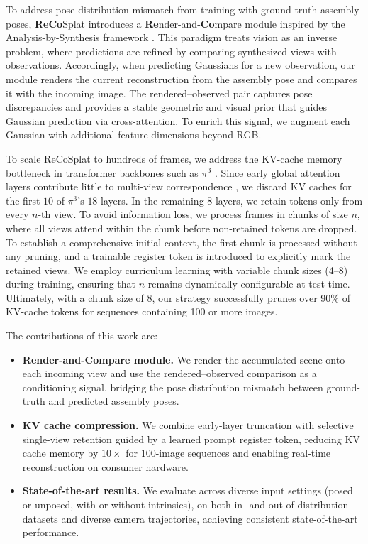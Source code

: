 \documentclass[runningheads]{llncs}
\begin{document}
To address pose distribution mismatch from training with ground-truth assembly poses, \textbf{ReCo}Splat introduces a \textbf{Re}nder-and-\textbf{Co}mpare module inspired by the Analysis-by-Synthesis framework \cite{YUILLE2006301}. 
This paradigm treats vision as an inverse problem, where predictions are refined by comparing synthesized views with observations. 
Accordingly, when predicting Gaussians for a new observation, our module renders the current reconstruction from the assembly pose and compares it with the incoming image. 
The rendered–observed pair captures pose discrepancies and provides a stable geometric and visual prior that guides Gaussian prediction via cross-attention. 
To enrich this signal, we augment each Gaussian with additional feature dimensions beyond RGB.

To scale ReCoSplat to hundreds of frames, we address the KV-cache memory bottleneck in transformer backbones such as $\pi^3$ \cite{pi3}. 
Since early global attention layers contribute little to multi-view correspondence \cite{sun2025avggtrethinkingglobalattention}, we discard KV caches for the first $10$ of $\pi^3$’s $18$ layers. 
In the remaining $8$ layers, we retain tokens only from every $n$-th view. 
To avoid information loss, we process frames in chunks of size $n$, where all views attend within the chunk before non-retained tokens are dropped. 
To establish a comprehensive initial context, the first chunk is processed without any pruning, and a trainable register token is introduced to explicitly mark the retained views. We employ curriculum learning with variable chunk sizes (4–8) during training, ensuring that $n$ remains dynamically configurable at test time. Ultimately, with a chunk size of 8, our strategy successfully prunes over 90\% of KV-cache tokens for sequences containing 100 or more images.

The contributions of this work are:
\begin{itemize}
    \item \textbf{Render-and-Compare module.}
    We render the accumulated scene onto each incoming view and use the rendered–observed comparison as a conditioning signal, bridging the pose distribution mismatch between ground-truth and predicted assembly poses.
    \item \textbf{KV cache compression.}
    We combine early-layer truncation with selective single-view retention guided by a learned prompt register token, reducing KV cache memory by $10\times$ for 100-image sequences and enabling real-time reconstruction on consumer hardware.
    \item \textbf{State-of-the-art results.}
    We evaluate across diverse input settings (posed or unposed, with or without intrinsics), on both in- and out-of-distribution datasets and diverse camera trajectories, achieving consistent state-of-the-art performance.
\end{itemize}
\end{document}
